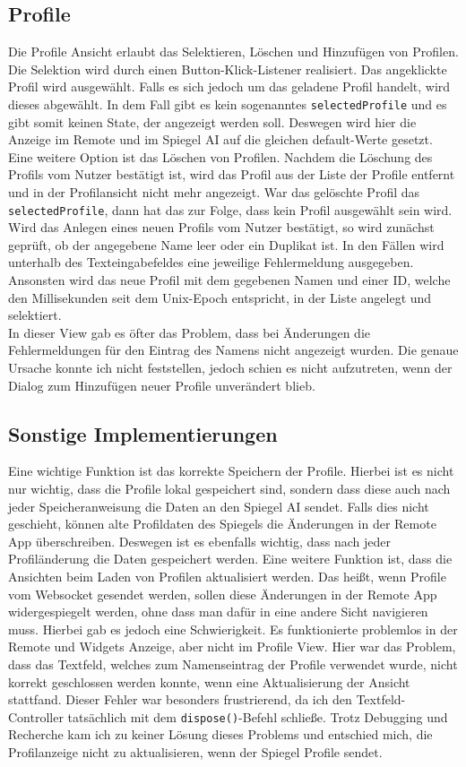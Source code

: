 \subsection{Profile}
Die Profile Ansicht erlaubt das Selektieren, Löschen und Hinzufügen von Profilen. Die Selektion wird durch einen Button-Klick-Listener realisiert. Das angeklickte Profil wird ausgewählt. Falls es sich jedoch um das geladene Profil handelt, wird dieses abgewählt. In dem Fall gibt es kein sogenanntes \texttt{selectedProfile} und es gibt somit keinen State, der angezeigt werden soll. Deswegen wird hier die Anzeige im Remote und im Spiegel AI auf die gleichen default-Werte gesetzt. Eine weitere Option ist das Löschen von Profilen. Nachdem die Löschung des Profils vom Nutzer bestätigt ist, wird das Profil aus der Liste der Profile entfernt und in der Profilansicht nicht mehr angezeigt. War das gelöschte Profil das \texttt{selectedProfile}, dann hat das zur Folge, dass kein Profil ausgewählt sein wird. Wird das Anlegen eines neuen Profils vom Nutzer bestätigt, so wird zunächst geprüft, ob der angegebene Name leer oder ein Duplikat ist. In den Fällen wird unterhalb des Texteingabefeldes eine jeweilige Fehlermeldung ausgegeben. Ansonsten wird das neue Profil mit dem gegebenen Namen und einer ID, welche den Millisekunden seit dem Unix-Epoch entspricht, in der Liste angelegt und selektiert. \\
In dieser View gab es öfter das Problem, dass bei Änderungen die Fehlermeldungen für den Eintrag des Namens nicht angezeigt wurden. Die genaue Ursache konnte ich nicht feststellen, jedoch schien es nicht aufzutreten, wenn der Dialog zum Hinzufügen neuer Profile unverändert blieb.

\subsection{Sonstige Implementierungen}
Eine wichtige Funktion ist das korrekte Speichern der Profile. Hierbei ist es nicht nur wichtig, dass die Profile lokal gespeichert sind, sondern dass diese auch nach jeder Speicheranweisung die Daten an den Spiegel AI sendet. Falls dies nicht geschieht, können alte Profildaten des Spiegels die Änderungen in der Remote App überschreiben. Deswegen ist es ebenfalls wichtig, dass nach jeder Profiländerung die Daten gespeichert werden. Eine weitere Funktion ist, dass die Ansichten beim Laden von Profilen aktualisiert werden. Das heißt, wenn Profile vom Websocket gesendet werden, sollen diese Änderungen in der Remote App widergespiegelt werden, ohne dass man dafür in eine andere Sicht navigieren muss. Hierbei gab es jedoch eine Schwierigkeit. Es funktionierte problemlos in der Remote und Widgets Anzeige, aber nicht im Profile View. Hier war das Problem, dass das Textfeld, welches zum Namenseintrag der Profile verwendet wurde, nicht korrekt geschlossen werden konnte, wenn eine Aktualisierung der Ansicht stattfand. Dieser Fehler war besonders frustrierend, da ich den Textfeld-Controller tatsächlich mit dem \texttt{dispose()}-Befehl schließe. Trotz Debugging und Recherche kam ich zu keiner Lösung dieses Problems und entschied mich, die Profilanzeige nicht zu aktualisieren, wenn der Spiegel Profile sendet.
